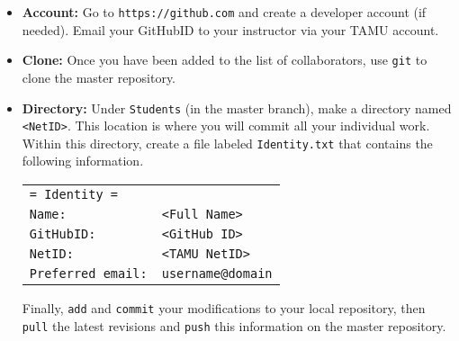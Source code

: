 \documentclass[11pt]{article}
\begin{document}
\begin{itemize}
\item \textbf{Account:} Go to \texttt{https://github.com} and create a developer account (if needed).
Email your GitHubID to your instructor via your TAMU account.
\item \textbf{Clone:} Once you have been added to the list of collaborators, use \texttt{git} to clone the master repository.
\item \textbf{Directory:} Under \texttt{Students} (in the master branch), make a directory named \texttt{<NetID>}.
This location is where you will commit all your individual work.
Within this directory, create a file labeled \texttt{Identity.txt} that contains the following information.
\begin{center}
\begin{tabular}{ll}
\texttt{= Identity =} \\
\texttt{Name:} & \texttt{<Full Name>} \\
\texttt{GitHubID:} & \texttt{<GitHub ID>} \\
\texttt{NetID:} & \texttt{<TAMU NetID>} \\
\texttt{Preferred email:} & \texttt{username@domain} \\
\end{tabular}
\end{center}
Finally, \texttt{add} and \texttt{commit} your modifications to your local repository, then \texttt{pull} the latest revisions and \texttt{push} this information on the master repository.
\end{itemize}
\end{document}

